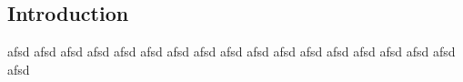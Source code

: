 \documentclass[11pt]{article}
\begin{document}
\begin{multicols}{2}

\section{Introduction}
	afsd afsd afsd afsd afsd afsd afsd afsd afsd afsd afsd afsd afsd afsd afsd afsd afsd afsd 
	
\end{multicols}	
\end{document}

